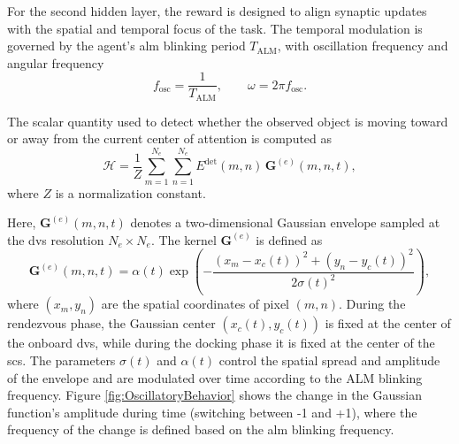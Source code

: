 



For the second hidden layer, the reward is designed to align synaptic updates with the spatial and temporal focus of the task. 
The temporal modulation is governed by the agent's \ac{alm} blinking period $T_{\text{ALM}}$, with oscillation frequency and angular frequency
\begin{equation}
f_{\text{osc}} = \frac{1}{T_{\text{ALM}}}, \qquad \omega = 2\pi f_{\text{osc}} .
\end{equation}

The scalar quantity used to detect whether the observed object is moving toward or away from the current center of attention is computed as
\begin{equation}
\mathcal{H} = \frac{1}{Z} \sum_{m=1}^{N_e}\sum_{n=1}^{N_e} 
E^{\mathrm{det}}(m,n)\, \mathbf{G}^{(e)}(m,n,t),
\end{equation}
where $Z$ is a normalization constant.

Here, $\mathbf{G}^{(e)}(m,n,t)$ denotes a two-dimensional Gaussian envelope sampled at the \ac{dvs} resolution $N_e \times N_e$. 
The kernel $\mathbf{G}^{(e)}$ is defined as
\begin{equation}
\mathbf{G}^{(e)}(m,n,t) =
\alpha(t)\exp\!\left(
-\frac{(x_m-x_c(t))^2+(y_n-y_c(t))^2}{2\sigma(t)^2}
\right),
\label{eq:2DGaussianEnvelopeKernel}
\end{equation}
where $(x_m,y_n)$ are the spatial coordinates of pixel $(m,n)$. 
During the rendezvous phase, the Gaussian center $(x_c(t),y_c(t))$ is fixed at the center of the onboard \ac{dvs}, while during the docking phase it is fixed at the center of the \ac{scs}. 
The parameters $\sigma(t)$ and $\alpha(t)$ control the spatial spread and amplitude of the envelope and are modulated over time according to the ALM blinking frequency. Figure \ref{fig:OscillatoryBehavior} shows the change in the Gaussian function's amplitude during time (switching between -1 and +1), where the frequency of the change is defined based on the \ac{alm} blinking frequency.

